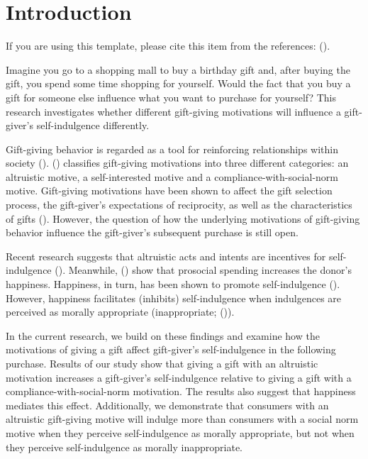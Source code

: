 \documentclass[11pt, a4paper, leqno]{article}
\begin{document}
\section{Introduction} %
\label{sec:introduction}
If you are using this template, please cite this item from the references: (\cite{GaudeckerEconProjectTemplates}). \par
\setlength{\parindent}{2ex} 
Imagine you go to a shopping mall to buy a birthday gift and, after buying the gift, you spend some time shopping for yourself. Would the fact that you buy a gift for someone else influence what you want to purchase for yourself? This research investigates whether different gift-giving motivations will influence a gift-giver’s self-indulgence differently. \par
Gift-giving behavior is regarded as a tool for reinforcing relationships within society (\cite{Caplow1982}). \citeauthor{Wolfinbarger1990} (\citeyear{Wolfinbarger1990}) classifies gift-giving motivations into three different categories: an altruistic motive, a self-interested motive and a compliance-with-social-norm motive. Gift-giving motivations have been shown to affect the gift selection process, the gift-giver’s expectations of reciprocity, as well as the characteristics of gifts (\cite{Goodwin1990}). However, the question of how the underlying motivations of gift-giving behavior influence the gift-giver’s subsequent purchase is still open. \par
Recent research suggests that altruistic acts and intents are incentives for self-indulgence (\cite{Khan2006}). Meanwhile, \citeauthor{Dunn2008} (\citeyear{Dunn2008}) show that prosocial spending increases the donor’s happiness. Happiness, in turn, has been shown to promote self-indulgence (\cite{Mischel1968, Perry1985, Rosenhan1974}). However, happiness facilitates (inhibits) self-indulgence when indulgences are perceived as morally appropriate (inappropriate; (\cite{Perry1985})). \par
In the current research, we build on these findings and examine how the motivations of giving a gift affect gift-giver’s self-indulgence in the following purchase. Results of our study show that giving a gift with an altruistic motivation increases a gift-giver’s self-indulgence relative to giving a gift with a compliance-with-social-norm motivation. The results also suggest that happiness mediates this effect. Additionally, we demonstrate that consumers with an altruistic gift-giving motive will indulge more than consumers with a social norm motive when they perceive self-indulgence as morally appropriate, but not when they perceive self-indulgence as morally inappropriate. \par
\end{document}
